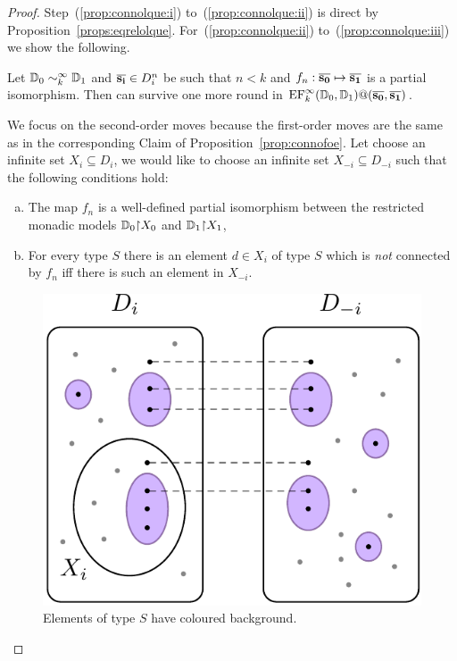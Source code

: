 \begin{proof}
Step~(\ref{prop:connolque:i}) to~(\ref{prop:connolque:ii}) is direct by 
Proposition~\ref{props:eqrelolque}. For~(\ref{prop:connolque:ii}) 
to~(\ref{prop:connolque:iii}) we show the following.

\begin{claimfirst}
Let $\mathbb{D}_0 \sim_k^\infty \mathbb{D}_1$ and $\overline{{\mathbf{s_i}}} \in D_i^n$ be such
that $n<k$ and $f_n:\overline{{\mathbf{s_0}}}\mapsto\overline{{\mathbf{s_1}}}$ is a partial isomorphism.
Then \eloise can survive one more round in $\mathrm{EF}_{k}^\infty(\mathbb{D}_0,
\mathbb{D}_1)@(\overline{{\mathbf{s_0}}},\overline{{\mathbf{s_1}}})$.
\end{claimfirst}
\begin{pfclaim}
We focus on the second-order moves because the first-order moves are the same as
in the corresponding Claim of Proposition~\ref{prop:connofoe}. 
Let \abelard choose an infinite set $X_i \subseteq D_i$, we would like \eloise
to choose an infinite set $X_{-i} \subseteq D_{-i}$ such that the following 
conditions hold:

\begin{enumerate}[(a)]
\parskip 0pt
\item\label{it:piso} 
The map $f_n$ is a well-defined partial isomorphism between the restricted
monadic models $\mathbb{D}_0{\upharpoonright}X_0$ and $\mathbb{D}_1{\upharpoonright}X_1$,



\item\label{it:equiv}
For every type $S$ there is an element $d\in X_i$ of type $S$ which is 
\emph{not} connected by $f_n$ iff there is such an element in $X_{-i}$.
\end{enumerate}	
\begin{figure}[ht]
\centering
\includegraphics[scale=0.7]{figures/fig-efinf.pdf}
\caption{Elements of type $S$ have coloured background.}
\label{fig:efinf}
\end{figure}


\end{pfclaim}
\end{proof}
